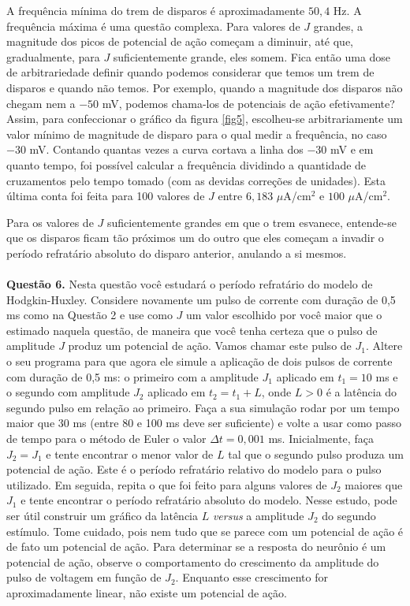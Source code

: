 \documentclass[english,11pt,a4paper]{article}
\begin{document}
	A frequência mínima do trem de disparos é aproximadamente $50,4$ Hz. A frequência máxima é uma questão complexa. Para valores de $J$ grandes, a magnitude dos picos de potencial de ação começam a diminuir, até que, gradualmente, para $J$ suficientemente grande, eles somem. Fica então uma dose de arbitrariedade definir quando podemos considerar que temos um trem de disparos e quando não temos. Por exemplo, quando a magnitude dos disparos não chegam nem a $-50$ mV, podemos chama-los de potenciais de ação efetivamente? Assim, para confeccionar o gráfico da figura \ref{fig5}, escolheu-se arbitrariamente um valor mínimo de magnitude de disparo para o qual medir a frequência, no caso $-30$ mV. Contando quantas vezes a curva cortava a linha dos $-30$ mV e em quanto tempo, foi possível calcular a frequência dividindo a quantidade de cruzamentos pelo tempo tomado (com as devidas correções de unidades). Esta última conta foi feita para 100 valores de $J$ entre $6,183$ $\mu$A/cm$^2$ e $100$ $\mu$A/cm$^2$.
	
	Para os valores de $J$ suficientemente grandes em que o trem esvanece, entende-se que os disparos ficam tão próximos um do outro que eles começam a invadir o período refratário absoluto do disparo anterior, anulando a si mesmos.\\\\
	
	
	\noindent \textbf{Questão 6.} Nesta questão você estudará o período refratário do modelo de Hodgkin-Huxley. Considere novamente um pulso de corrente com duração de 0,5 ms como na Questão 2 e use como $J$ um valor escolhido por você maior que o estimado naquela questão, de maneira que você tenha certeza que o pulso de amplitude $J$ produz um potencial de ação. Vamos chamar este pulso de $J_1$. Altere o seu programa para que agora ele simule a aplicação de dois pulsos de corrente com duração de 0,5 ms: o primeiro com a amplitude $J_1$ aplicado em $t_1 = 10$ ms e o segundo com amplitude $J_2$ aplicado em $t_2 = t_1 + L$, onde $L > 0$ é a latência do segundo pulso em relação ao primeiro. Faça a sua simulação rodar por um tempo maior que 30 ms (entre 80 e 100 ms deve ser suficiente) e volte a usar como passo de tempo para o método de Euler o valor $\Delta t = 0{,}001$ ms. Inicialmente, faça $J_2 = J_1$ e tente encontrar o menor valor de $L$ tal que o segundo pulso produza um potencial de ação. Este é o período refratário relativo do modelo para o pulso utilizado. Em seguida, repita o que foi feito para alguns valores de $J_2$ maiores que $J_1$ e tente encontrar o período refratário absoluto do modelo. Nesse estudo, pode ser útil construir um gráfico da latência $L$ \textit{versus} a amplitude $J_2$ do segundo estímulo. Tome cuidado, pois nem tudo que se parece com um potencial de ação é de fato um potencial de ação. Para determinar se a resposta do neurônio é um potencial de ação, observe o comportamento do crescimento da amplitude do pulso de voltagem em função de $J_2$. Enquanto esse crescimento for aproximadamente linear, não existe um potencial de ação.\\\\
	
\end{document}
